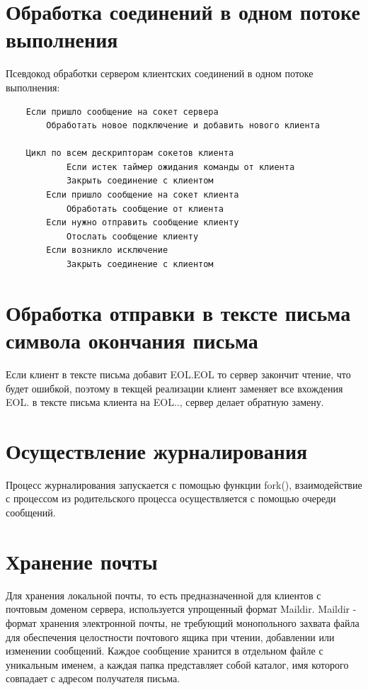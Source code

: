 \documentclass[a4paper,12pt]{report}
\begin{document}
\newpage


\section{Обработка соединений в одном потоке выполнения}

Псевдокод обработки сервером клиентских соединений в одном потоке выполнения:

\begin{verbatim}
    Если пришло сообщение на сокет сервера 
        Обработать новое подключение и добавить нового клиента
    
    Цикл по всем дескрипторам сокетов клиента
    	    Если истек таймер ожидания команды от клиента
            Закрыть соединение с клиентом
        Если пришло сообщение на сокет клиента
            Обработать сообщение от клиента
        Если нужно отправить сообщение клиенту
            Отослать сообщение клиенту
        Если возникло исключение
            Закрыть соединение с клиентом

\end{verbatim}

\section{Обработка отправки в тексте письма символа окончания письма}
Если клиент в тексте письма добавит EOL.EOL то сервер закончит чтение, что будет ошибкой, поэтому в текщей реализации клиент заменяет все вхождения EOL. в тексте письма клиента на EOL.., сервер делает обратную замену.

\section{Осуществление журналирования}

Процесс журналирования запускается с помощью функции fork(), взаимодействие с процессом из родительского процесса осуществляется с помощью очереди сообщений.

\section{Хранение почты}

Для хранения локальной почты, то есть предназначенной для клиентов с почтовым доменом сервера, используется упрощенный формат Maildir. Maildir - формат хранения электронной почты, не требующий монопольного захвата файла для обеспечения целостности почтового ящика при чтении, добавлении или изменении сообщений. Каждое сообщение хранится в отдельном файле с уникальным именем, а каждая папка представляет собой каталог, имя которого совпадает с адресом получателя письма. 
\end{document}
